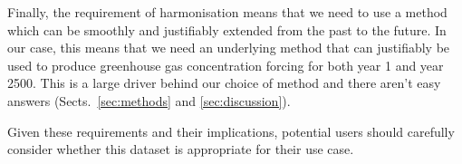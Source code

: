 Finally, the requirement of harmonisation means that we need to use a method
which can be smoothly and justifiably extended from the past to the future.
In our case, this means that we need an underlying method that can justifiably be used to produce
greenhouse gas concentration forcing for both year 1 and year 2500.
This is a large driver behind our choice of method
and there aren't easy answers (Sects.~\ref{sec:methods} and \ref{sec:discussion}).

Given these requirements and their implications,
potential users should carefully consider whether this dataset is appropriate for their use case.
